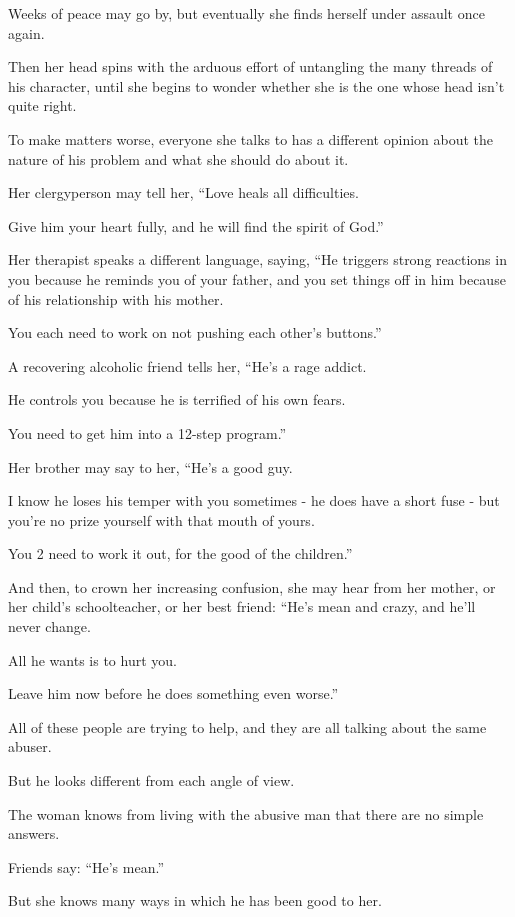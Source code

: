 \documentclass[oneside]{article}
\numberwithin{equation}{section}
\begin{document}
Weeks of peace may go by, but eventually she finds herself under assault once again.

Then her head spins with the arduous effort of untangling the many threads of his character, until she begins to wonder whether she is the one whose head isn't quite right.

%
To make matters worse, everyone she talks to has a different opinion about the nature of his problem and what she should do about it.

Her clergyperson may tell her, ``Love heals all difficulties.

Give him your heart fully, and he will find the spirit of God.''

Her therapist speaks a different language, saying, ``He triggers strong reactions in you because he reminds you of your father, and you set things off in him because of his relationship with his mother.

You each need to work on not pushing each other's buttons.''

A recovering alcoholic friend tells her, ``He's a rage addict.

He controls you because he is terrified of his own fears.

You need to get him into a 12-step program.''

Her brother may say to her, ``He's a good guy.

I know he loses his temper with you sometimes - he does have a short fuse - but you're no prize yourself with that mouth of yours.

You 2 need to work it out, for the good of the children.''

And then, to crown her increasing confusion, she may hear from her mother, or her child's schoolteacher, or her best friend: ``He's mean and crazy, and he'll never change.

All he wants is to hurt you.

Leave him now before he does something even worse.''

%
All of these people are trying to help, and they are all talking about the same abuser.

But he looks different from each angle of view.

%
The woman knows from living with the abusive man that there are no simple answers.

Friends say: ``He's mean.''

But she knows many ways in which he has been good to her.
\end{document}
